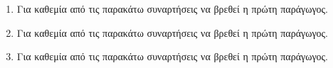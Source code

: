 \documentclass[11pt,a4paper]{article}
\begin{document}
\begin{enumerate}
\item
Για καθεμία από τις παρακάτω συναρτήσεις να βρεθεί η πρώτη παράγωγος.
\begin{multicols}{2}
\end{multicols}


\item
Για καθεμία από τις παρακάτω συναρτήσεις να βρεθεί η πρώτη παράγωγος.
\begin{multicols}{2}
\end{multicols}


\item
Για καθεμία από τις παρακάτω συναρτήσεις να βρεθεί η πρώτη παράγωγος.
\begin{multicols}{2}
\end{multicols}



\end{enumerate}
\end{document}
